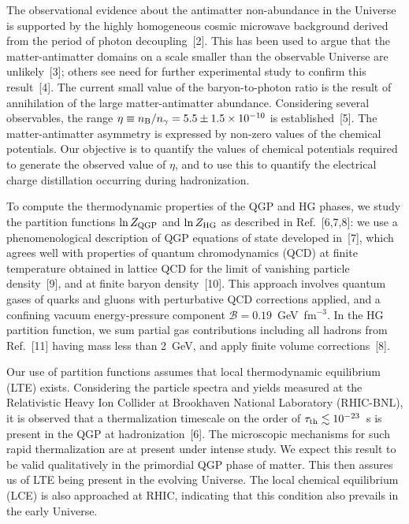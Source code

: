 \begin{mdframed}[linecolor=gray,roundcorner=12pt,backgroundcolor=Dandelion!15,linewidth=1pt,leftmargin=0cm,rightmargin=0cm,topline=true,bottomline=true,skipabove=12pt]
The observational evidence about the antimatter non-abundance in the Universe is supported by the highly homogeneous cosmic microwave background derived from the period of photon decoupling~[2]. This has been used  to argue that the  matter-antimatter domains on a scale smaller than the observable Universe are unlikely~[3]; others see need for further experimental study to confirm this result~[4]. The current small value of the baryon-to-photon ratio is the result of  annihilation of the large matter-antimatter abundance. Considering several observables, the range $\eta \equiv n_{\rm B}/n_\gamma = 5.5 \pm 1.5 \times 10^{-10}$ is established~[5]. The  matter-antimatter asymmetry is expressed by non-zero values of the chemical potentials. Our objective is to  quantify the values of  chemical potentials  required to generate the observed value of $\eta$, and to use this to quantify the electrical charge distillation occurring during hadronization. 

To compute the thermodynamic properties of the QGP and HG phases, we study the partition functions $\ln{Z_{\rm QGP}}$ and $\ln{Z_{\rm HG}}$ as described in Ref.~[6,7,8]: we use a phenomenological description of QGP equations of state developed in~[7], which agrees well with properties of quantum chromodynamics (QCD) at finite temperature obtained in lattice QCD  for the limit of vanishing particle density~[9], and at finite baryon density~[10]. This approach  involves quantum gases of quarks and gluons with perturbative QCD corrections applied, and a confining vacuum energy-pressure component ${\mathcal{B}}= 0.19$~GeV~fm$^{-3}$. In the HG partition function, we sum partial gas contributions including all hadrons  from Ref.~[11] having mass less than 2~GeV, and apply finite volume corrections~[8].

Our use of partition functions assumes that local thermodynamic equilibrium (LTE) exists. Considering the particle  spectra and yields measured at  the Relativistic Heavy Ion Collider at Brookhaven National Laboratory (RHIC-BNL), it is observed that a thermalization timescale on the order of $\tau_{\rm th}\lesssim 10^{-23}$~s is present in the QGP at hadronization~[6]. The microscopic mechanisms for such rapid thermalization are at present under intense study. We expect this result to be valid qualitatively in the primordial  QGP phase of matter. This then assures us of LTE being present in the evolving Universe. The local chemical equilibrium (LCE) is also approached at RHIC, indicating that this condition also prevails in the early Universe. 


\end{mdframed}
